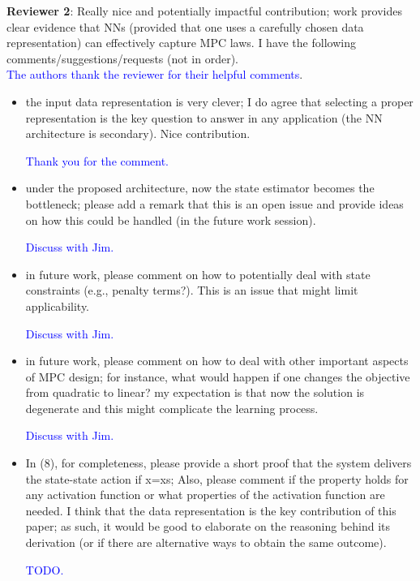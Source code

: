 \documentclass[xcolor=dvipsnames, 11pt]{article}
\newcommand{\reply}[1]{\textcolor{blue}{#1}}
\begin{document}
\textbf{Reviewer 2}: Really nice and potentially impactful contribution; work provides clear evidence that NNs (provided that one uses a carefully chosen data representation) can effectively capture MPC laws. I have the following comments/suggestions/requests (not in order). \\

\reply{The authors thank the reviewer for their helpful comments}.

\begin{itemize}
  \item the input data representation is very clever; I do agree that selecting a proper representation is the key question to answer in any application (the NN architecture is secondary). Nice contribution. 

  \reply{Thank you for the comment.}

  \item under the proposed architecture, now the state estimator becomes the bottleneck; please add a remark that this is an open issue and provide ideas on how this could be handled (in the future work session).

  \reply{Discuss with Jim.}

  \item in future work, please comment on how to potentially deal with state constraints (e.g., penalty terms?). This is an issue that might limit applicability.

  \reply{Discuss with Jim.}

  \item in future work, please comment on how to deal with other important aspects of MPC design; for instance, what would happen if one changes the objective from quadratic to linear? my expectation is that now the solution is degenerate and this might complicate the learning process.

  \reply{Discuss with Jim.}

  \item In (8), for completeness, please provide a short proof that the system delivers the state-state action if x=xs; Also, please comment if the property holds for any activation function or what properties of the activation function are needed. I think that the data representation is the key contribution of this paper; as such, it would be good to elaborate on the reasoning behind its derivation (or if there are alternative ways to obtain the same outcome).

  \reply{TODO.}


\end{itemize}
\end{document}
